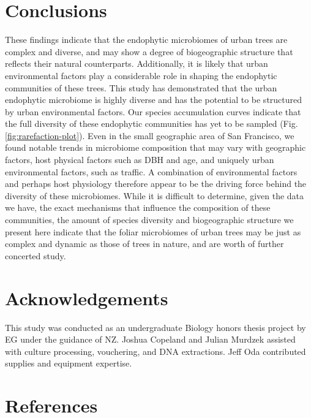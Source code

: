\documentclass[fleqn,10pt,lineno]{wlpeerj} %
\begin{document}
\hypertarget{conclusions}{%
\section*{Conclusions}\label{conclusions}}

These findings indicate that the endophytic microbiomes of urban trees are complex and diverse, and may show a degree of biogeographic structure that reflects their natural counterparts. Additionally, it is likely that urban environmental factors play a considerable role in shaping the endophytic communities of these trees. This study has demonstrated that the urban endophytic microbiome is highly diverse and has the potential to be structured by urban environmental factors. Our species accumulation curves indicate that the full diversity of these endophytic communities has yet to be sampled (Fig. \ref{fig:rarefaction-plot}). Even in the small geographic area of San Francisco, we found notable trends in microbiome composition that may vary with geographic factors, host physical factors such as DBH and age, and uniquely urban environmental factors, such as traffic. A combination of environmental factors and perhaps host physiology therefore appear to be the driving force behind the diversity of these microbiomes. While it is difficult to determine, given the data we have, the exact mechanisms that influence the composition of these communities, the amount of species diversity and biogeographic structure we present here indicate that the foliar microbiomes of urban trees may be just as complex and dynamic as those of trees in nature, and are worth of further concerted study.

\hypertarget{acknowledgements}{%
\section*{Acknowledgements}\label{acknowledgements}}

This study was conducted as an undergraduate Biology honors thesis project by EG under the guidance of NZ. Joshua Copeland and Julian Murdzek assisted with culture processing, vouchering, and DNA extractions. Jeff Oda contributed supplies and equipment expertise.

\hypertarget{references}{%
\section*{References}\label{references}}
\end{document}

